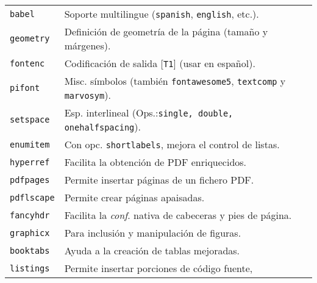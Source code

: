 \documentclass[10pt,landscape,a4paper]{article}
\begin{document}
\begin{multicols}{3}
\begin{tabular}{@{}p{\the\MyLen}%
                @{}p{\linewidth-\the\MyLen}@{}}
\texttt{babel}		& Soporte multilingue (\texttt{spanish}, \texttt{english}, etc.).\\
\texttt{geometry}	& Definición de geometría de la página (tamaño y márgenes).\\
\texttt{fontenc}	& Codificación de salida [\texttt{T1}] (usar en español).\\
\texttt{pifont}	& Misc. símbolos (también \texttt{fontawesome5}, \texttt{textcomp} y \texttt{marvosym}). \\
\texttt{setspace}	& Esp. interlineal (Ops.:\texttt{{single}, \texttt{double}, \texttt{onehalf}}\texttt{spacing}). \\
\texttt{enumitem}    & Con opc. \texttt{shortlabels}, mejora el control de listas.\\
\texttt{hyperref}	& Facilita la obtención de PDF enriquecidos.\\
\texttt{pdfpages}	& Permite insertar páginas de un fichero PDF.\\
\texttt{pdflscape}	& Permite crear páginas apaisadas.\\
\texttt{fancyhdr}	& Facilita la \emph{conf}. nativa de cabeceras y pies de página.\\
\texttt{graphicx}	& Para inclusión y manipulación de figuras.\\
\texttt{booktabs}	& Ayuda a la creación de tablas mejoradas.\\
\texttt{listings}	& Permite insertar porciones de código fuente,\\
\end{tabular}




\end{multicols}
\end{document}

